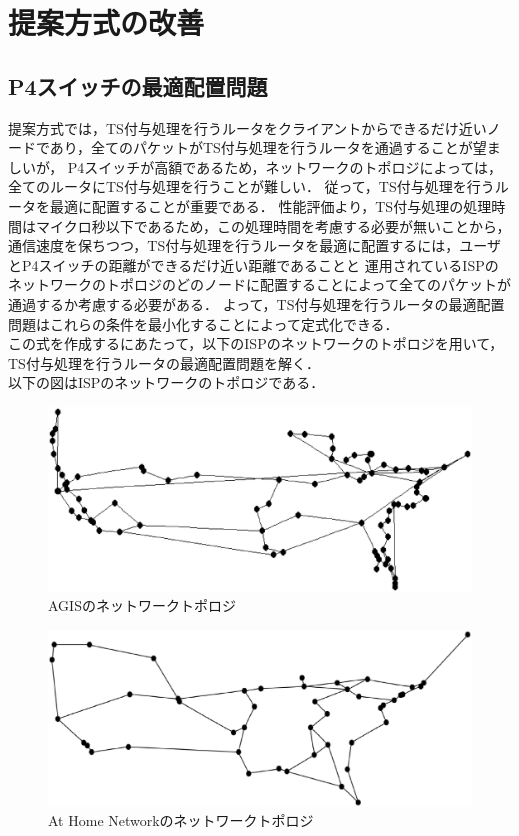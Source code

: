 \documentclass[a4j,11pt]{jreport}
\begin{document}
\chapter{提案方式の改善}

\section{P4スイッチの最適配置問題}
提案方式では，TS付与処理を行うルータをクライアントからできるだけ近いノードであり，全てのパケットがTS付与処理を行うルータを通過することが望ましいが，
P4スイッチが高額であるため，ネットワークのトポロジによっては，全てのルータにTS付与処理を行うことが難しい．
従って，TS付与処理を行うルータを最適に配置することが重要である．
性能評価より，TS付与処理の処理時間はマイクロ秒以下であるため，この処理時間を考慮する必要が無いことから，
通信速度を保ちつつ，TS付与処理を行うルータを最適に配置するには，ユーザとP4スイッチの距離ができるだけ近い距離であることと
運用されているISPのネットワークのトポロジのどのノードに配置することによって全てのパケットが通過するか考慮する必要がある．
よって，TS付与処理を行うルータの最適配置問題はこれらの条件を最小化することによって定式化できる．\\
\indent
この式を作成するにあたって，以下のISPのネットワークのトポロジを用いて，TS付与処理を行うルータの最適配置問題を解く．\\
以下の図はISPのネットワークのトポロジである．

\begin{figure}[htbp]
  \centering
  \includegraphics[scale=0.555]{data/AGIS.eps}
  \vspace{0mm}
  \caption{AGISのネットワークトポロジ}
  \label{fig:AGIS}
\end{figure}

\bigskip

\begin{figure}[htbp]
  \centering
  \includegraphics[scale=0.526]{data/At_Home_Network.eps}
  \vspace{0mm}
  \caption{At Home Networkのネットワークトポロジ}
  \label{fig:At}
\end{figure}
\end{document}
